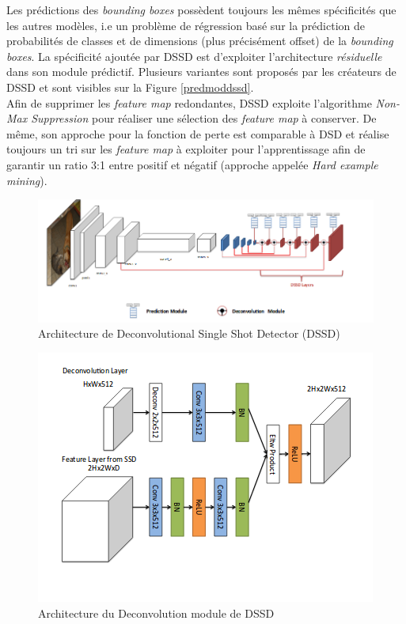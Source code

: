\noindent Les prédictions des \textit{bounding boxes} possèdent toujours les mêmes spécificités que les autres modèles, i.e un problème de régression basé sur la prédiction de probabilités de classes et de dimensions (plus précisément offset) de la \textit{bounding boxes}. La spécificité ajoutée par DSSD est d'exploiter l'architecture \textit{résiduelle} dans son module prédictif. Plusieurs variantes sont proposés par les créateurs de DSSD et sont visibles sur la Figure \ref{predmoddssd}.\\

\noindent Afin de supprimer les \textit{feature map} redondantes, DSSD exploite l'algorithme \textit{Non-Max Suppression} pour réaliser une sélection des \textit{feature map} à conserver. De même, son approche pour la fonction de perte est comparable à DSD et réalise toujours un tri sur les \textit{feature map} à exploiter pour l'apprentissage afin de garantir un ratio 3:1 entre positif et négatif (approche appelée \textit{Hard example mining}).

\begin{figure}
\centering
\includegraphics[scale=0.4]{./tex/computer-vision/sota/dssd.png}
\caption{Architecture de Deconvolutional Single Shot Detector (DSSD)}
\label{dssd}
\end{figure}

\begin{figure}
\centering
\includegraphics[scale=0.4]{./tex/computer-vision/sota/deconvmod.png}
\caption{Architecture du Deconvolution module de DSSD}
\label{deconvmodfig}
\end{figure}

